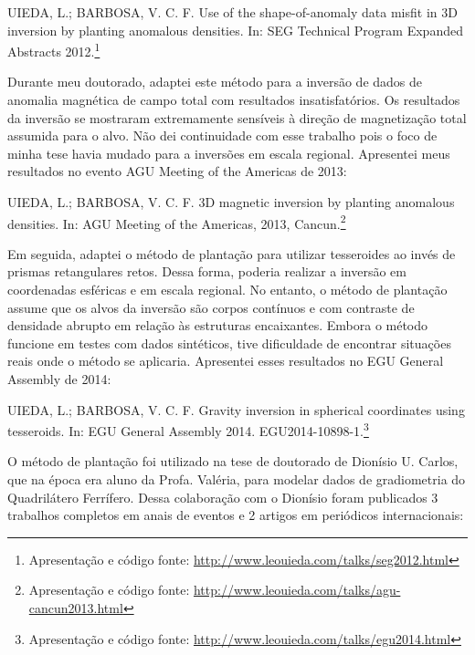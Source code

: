 \documentclass[12pt,a4paper,oneside,titlepage,onecolumn]{article}
\begin{document}
\begin{displayquote}
    UIEDA, L.; BARBOSA, V. C. F. Use of the shape-of-anomaly data
    misfit in 3D inversion by planting anomalous densities. In: SEG Technical
    Program Expanded Abstracts 2012.\footnote{Apresentação e código fonte:
    \url{http://www.leouieda.com/talks/seg2012.html}}
\end{displayquote}


Durante meu doutorado, adaptei este método para a inversão de dados de anomalia
magnética de campo total com resultados insatisfatórios.
Os resultados da inversão se mostraram extremamente sensíveis à direção de
magnetização total assumida para o alvo.
Não dei continuidade com esse trabalho pois o foco de minha tese havia mudado
para a inversões em escala regional.
Apresentei meus resultados no evento AGU Meeting of the Americas de 2013:

\begin{displayquote}
    UIEDA, L.; BARBOSA, V. C. F. 3D magnetic inversion by planting anomalous
    densities. In: AGU Meeting of the Americas, 2013,
    Cancun.\footnote{Apresentação e código fonte:
    \url{http://www.leouieda.com/talks/agu-cancun2013.html}}
\end{displayquote}

Em seguida, adaptei o método de plantação para utilizar tesseroides ao invés de
prismas retangulares retos.
Dessa forma, poderia realizar a inversão em coordenadas esféricas e em escala
regional.
No entanto, o método de plantação assume que os alvos da inversão são corpos
contínuos e com contraste de densidade abrupto em relação às estruturas
encaixantes.
Embora o método funcione em testes com dados sintéticos,
tive dificuldade de encontrar situações reais onde o método se aplicaria.
Apresentei esses resultados no EGU General Assembly de 2014:

\begin{displayquote}
    UIEDA, L.; BARBOSA, V. C. F. Gravity inversion in spherical
    coordinates using tesseroids. In: EGU General Assembly 2014.
    EGU2014-10898-1.\footnote{Apresentação e código fonte:
    \url{http://www.leouieda.com/talks/egu2014.html}}
\end{displayquote}


O método de plantação foi utilizado na tese de doutorado de Dionísio U. Carlos,
que na época era aluno da Profa. Valéria, para modelar dados de gradiometria do
Quadrilátero Ferrífero.
Dessa colaboração com o Dionísio foram publicados 3 trabalhos completos em
anais de eventos e 2 artigos em periódicos internacionais:
\end{document}
